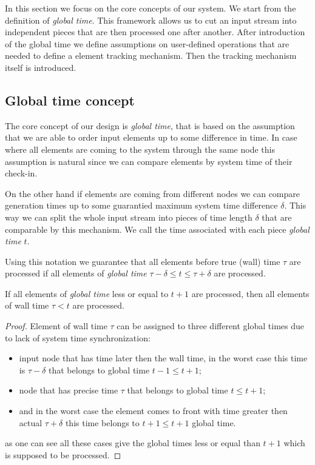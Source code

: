 \label{fs-acker-design}

In this section we focus on the core concepts of our system. We start from the definition of \textit{global time}. This framework allows us to cut an input stream into independent pieces that are then processed one after another. After introduction of the global time we define assumptions on user-defined operations that are needed to define a element tracking mechanism. Then the tracking mechanism itself is introduced.

\subsection{Global time concept}
The core concept of our design is \textit{global time}, that is based on the assumption that we are able to order input elements up to some difference in time. In case where all elements are coming to the system through the same node this assumption is natural since we can compare elements by system time of their check-in.

On the other hand if elements are coming from different nodes we can compare generation times up to some guarantied maximum system time difference $\delta$. This way we can split the whole input stream into pieces of time length $\delta$ that are comparable by this mechanism. We call the time associated with each piece \textit{global time} $t$.

Using this notation we guarantee that all elements before true (wall) time $\tau$ are processed if all elements of \textit{global time} $\tau - \delta \le t \le \tau + \delta$ are processed.

\begin{lemma}
\label{gt-lemma}
If all elements of \textit{global time} less or equal to $t + 1$ are processed, then all elements of wall time $\tau < t$ are processed.
\end{lemma}
\begin{proof}
Element of wall time $\tau$ can be assigned to three different global times due to lack of system time synchronization:
\begin{itemize}
    \item input node that has time later then the wall time, in the worst case this time is $\tau - \delta$ that belongs to global time $t - 1 \le t + 1$;
    \item node that has precise time $\tau$ that belongs to global time $t \le t + 1$;
    \item and in the worst case the element comes to front with time greater then actual $\tau + \delta$ this time belongs to $t + 1 \le t + 1$ global time.
\end{itemize}
as one can see all these cases give the global times less or equal than $t + 1$ which is supposed to be processed.
\end{proof}


